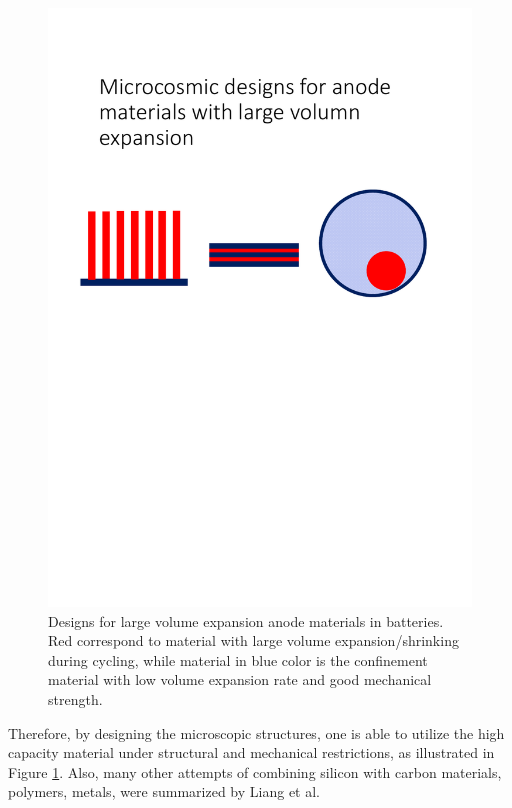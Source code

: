 \begin{figure}  
\centering
\includegraphics[width=\textwidth]{figures/figure1_silibdesign}
\caption[Designs for large volume expansion anode materials]{Designs for large volume expansion anode materials in batteries. Red correspond to material with large volume expansion/shrinking during cycling, while material in blue color is the confinement material with low volume expansion rate and good mechanical strength. 
\label{fig:1silibdesign}}
\end{figure}
 
Therefore, by designing the microscopic structures, one is able to utilize the high capacity material under structural and mechanical restrictions, as illustrated in Figure \ref{fig:1silibdesign}. Also, many other attempts of combining silicon with carbon materials,  polymers,  metals, were summarized by Liang et al.\cite{Liang2014} 
 
